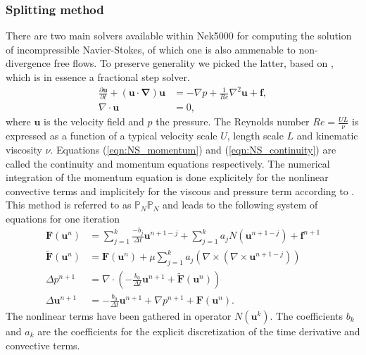 \documentclass{sig-alternate}
\begin{document}
\subsubsection{Splitting method}
There are two main solvers available within Nek5000 for computing the solution of incompressible Navier-Stokes, of which one is also ammenable to non-divergence free flows. To preserve generality we picked the latter, based on \cite{Tomboulides1997}, which is in essence a fractional step solver.
\begin{align}
 \frac{\partial \mathbf{u}}{\partial t} + (\mathbf{u \cdot \nabla}) \mathbf{u} & = - \nabla p + \frac{1}{Re} \nabla^2 \mathbf{u} + \mathbf{f} \label{eqn:NS_momentum},\\
 \nabla \cdot \mathbf{u} & = 0, \label{eqn:NS_continuity}
\end{align}
where $\mathbf{u}$ is the velocity field and $p$ the pressure. The Reynolds number $Re = \frac{U L}{\nu}$ is expressed as a function of a typical velocity scale $U$, length scale $L$ and kinematic viscosity $\nu$. Equations (\ref{eqn:NS_momentum})  and (\ref{eqn:NS_continuity}) are called the continuity and momentum equations respectively. The numerical integration of the momentum equation is done explicitely for the nonlinear convective terms and implicitely for the viscous and pressure term according to \cite{Tomboulides1997}. This method is referred to as $\mathbb{P}_N\mathbb{P}_N$ and leads to the following system of equations for one iteration
\begin {align}
 \mathbf{F} \left( \mathbf{u}^{n} \right) & = \sum_{j=1}^{k} \frac{-b_j}{\Delta t} \mathbf{u}^{n+1-j} + \sum_{j=1}^{k} a_j N \left( \mathbf{u}^{n+1-j} \right) +  \mathbf{f}^{n+1} \label{eqn:rhs1}\\
 \mathbf{\tilde{F}} \left( \mathbf{u}^{n} \right) & = \mathbf{F}\left(\mathbf{u}^{n}\right) + \mu \sum_{j=1}^{k} a_j \left( \nabla \times \left( \nabla \times \mathbf{u}^{n+1-j} \right) \right) \label{eqn:rhs2} \\
 \Delta p^{n+1} & = \nabla \cdot \left( -\frac{b_0}{\Delta t} \mathbf{u}^{n+1} + \mathbf{\tilde{F}} \left( \mathbf{u}^{n} \right) \right) \label{eqn:hmhz_pres}\\
 \Delta \mathbf{u}^{n+1} & = - \frac{b_0}{\Delta t} \mathbf{u}^{n+1} + \nabla p^{n+1} + \mathbf{F} \left( \mathbf{u}^{n} \right). \label{eqn:hmhz_vel}
\end {align}
The nonlinear terms have been gathered in operator $N \left( \mathbf{u}^{k} \right)$. The coefficients $b_k$ and $a_k$ are the coefficients for the explicit discretization of the time derivative and convective terms.
\end{document}
